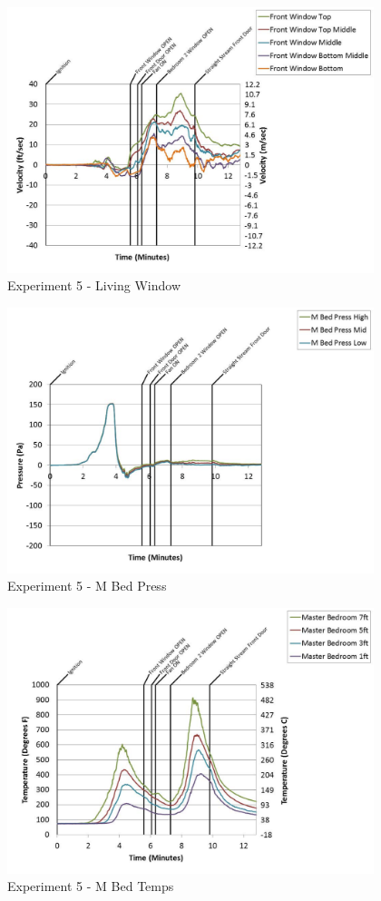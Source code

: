 \documentclass{article}
\begin{document}
\begin{appendices}
	\clearpage

	\begin{figure}[h!]
		\centering
		\includegraphics[height=3.05in]{0_Images/Results_Charts/Exp_5_Charts/LivingWindow.pdf}
		\caption{Experiment 5 - Living Window}
	\end{figure}
 

	\begin{figure}[h!]
		\centering
		\includegraphics[height=3.05in]{0_Images/Results_Charts/Exp_5_Charts/MBedPress.pdf}
		\caption{Experiment 5 - M Bed Press}
	\end{figure}
 
	\clearpage

	\begin{figure}[h!]
		\centering
		\includegraphics[height=3.05in]{0_Images/Results_Charts/Exp_5_Charts/MBedTemps.pdf}
		\caption{Experiment 5 - M Bed Temps}
	\end{figure}
 


\end{appendices}
\end{document}
